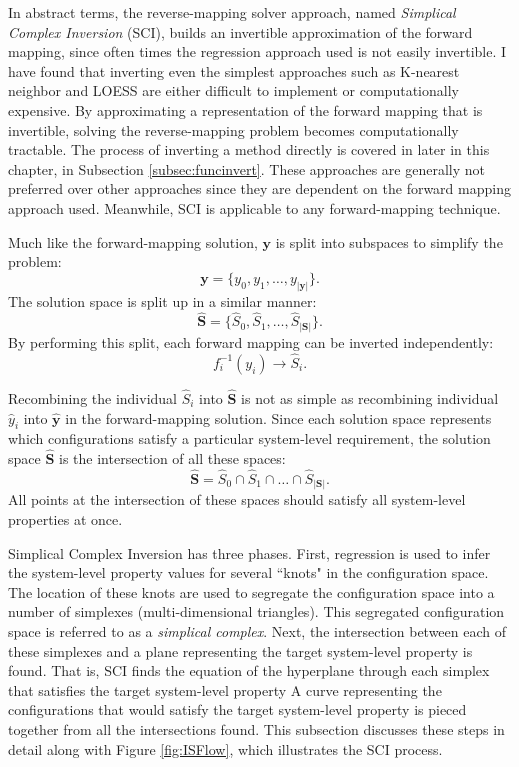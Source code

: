 In abstract terms, the \fw reverse-mapping solver approach, named \textit{Simplical Complex Inversion} (SCI), builds an invertible approximation of the forward mapping, since often times the regression approach used is not easily invertible.
I have found that inverting even the simplest approaches such as K-nearest neighbor and LOESS are either difficult to implement or computationally expensive.
By approximating a representation of the forward mapping that is invertible, solving the reverse-mapping problem becomes computationally tractable.
The process of inverting a method directly is covered in later in this chapter, in Subsection \ref{subsec:funcinvert}.
These approaches are generally not preferred over other approaches since they are dependent on the forward mapping approach used.
Meanwhile, SCI is applicable to any forward-mapping technique.

Much like the forward-mapping solution, $\mathbf y$ is split into subspaces to simplify the problem:
\[ \mathbf y = \{y_0, y_1, \ldots, y_{|\mathbf y|}\}. \]
The solution space is split up in a similar manner:
\[ \hat{\mathbf S} = \{\hat S_0, \hat S_1, \ldots, \hat S_{|\mathbf S|}\}. \]
By performing this split, each forward mapping can be inverted independently:
\[ f^{-1}_i(y_i) \rightarrow \hat S_i. \]

Recombining the individual $\hat S_i$ into $\hat{\mathbf S}$ is not as simple as recombining individual $\hat y_i$ into $\hat{\mathbf y}$ in the forward-mapping solution.
Since each solution space represents which configurations satisfy a particular system-level requirement, the solution space $\hat{\mathbf S}$ is the intersection of all these spaces:
\[ \hat{\mathbf S} = \hat S_0 \cap \hat S_1 \cap \ldots \cap \hat S_{|\mathbf S|}.\]
All points at the intersection of these spaces should satisfy all system-level properties at once.

Simplical Complex Inversion has three phases.
First, regression is used to infer the system-level property values for several ``knots" in the configuration space.
The location of these knots are used to segregate the configuration space into a number of simplexes (multi-dimensional triangles).
This segregated configuration space is referred to as a \textit{simplical complex}.
Next, the intersection between each of these simplexes and a plane representing the target system-level property is found.
That is, SCI finds the equation of the hyperplane through each simplex that satisfies the target system-level property
A curve representing the configurations that would satisfy the target system-level property is pieced together from all the intersections found.
This subsection discusses these steps in detail along with Figure \ref{fig:ISFlow}, which illustrates the SCI process.

